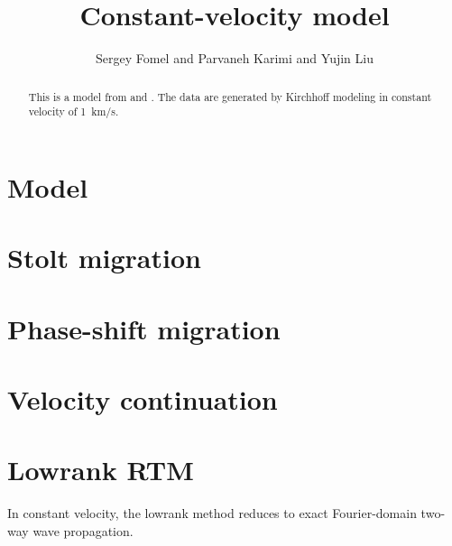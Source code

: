 \author{Sergey Fomel and Parvaneh Karimi and Yujin Liu}
\title{Constant-velocity model}

\maketitle

\begin{abstract}
This is a model from \cite{landa} and \cite{klokov}. The data are
generated by Kirchhoff modeling in constant velocity of 1~km/s.
\end{abstract}

\section{Model}

 \clearpage

\section{Stolt migration}

 \clearpage

\section{Phase-shift migration}

 \clearpage

\section{Velocity continuation}

 \clearpage

\section{Lowrank RTM}

In constant velocity, the lowrank method reduces to exact Fourier-domain two-way wave propagation.

 \clearpage


